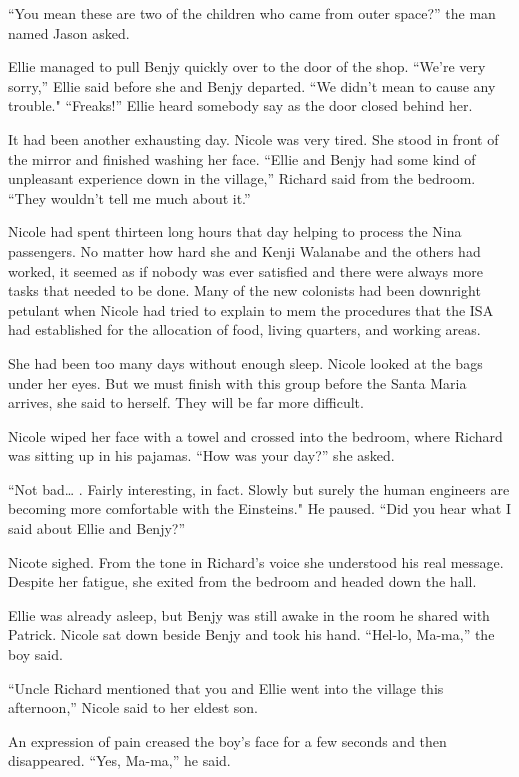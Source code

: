 \documentclass[]{article}
\begin{document}
{“You mean these are two of the children who came from outer space?” the man named Jason asked.

Ellie managed to pull Benjy quickly over to the door of the shop.  “We’re very sorry,” Ellie said before she and Benjy departed.  “We didn’t mean to cause any trouble."  “Freaks!” Ellie heard somebody say as the door closed behind her.

It had been another exhausting day.  Nicole was very tired.  She stood in front of the mirror and finished washing her face.  “Ellie and Benjy had some kind of unpleasant experience down in the village,” Richard said from the bedroom.  “They wouldn’t tell me much about it.”

Nicole had spent thirteen long hours that day helping to process the Nina passengers.  No matter how hard she and Kenji Walanabe and the others had worked, it seemed as if nobody was ever satisfied and there were always more tasks that needed to be done.  Many of the new colonists had been downright petulant when Nicole had tried to explain to mem the procedures that the ISA had established for the allocation of food, living quarters, and working areas.

She had been too many days without enough sleep.  Nicole looked at the bags under her eyes.  But we must finish with this group before the Santa Maria arrives, she said to herself.  They will be far more difficult.

Nicole wiped her face with a towel and crossed into the bedroom, where Richard was sitting up in his pajamas.  “How was your day?” she asked.

“Not bad… .  Fairly interesting, in fact.  Slowly but surely the human engineers are becoming more comfortable with the Einsteins."  He paused.  “Did you hear what I said about Ellie and Benjy?”

Nicote sighed.  From the tone in Richard’s voice she understood his real message.  Despite her fatigue, she exited from the bedroom and headed down the hall.

Ellie was already asleep, but Benjy was still awake in the room he shared with Patrick.  Nicole sat down beside Benjy and took his hand.  “Hel-lo, Ma-ma,” the boy said.

“Uncle Richard mentioned that you and Ellie went into the village this afternoon,” Nicole said to her eldest son.

An expression of pain creased the boy’s face for a few seconds and then disappeared.  “Yes, Ma-ma,” he said.

}
\end{document}
